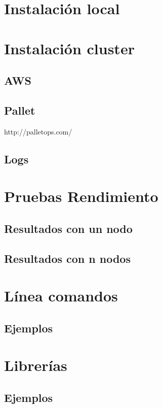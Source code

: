 \section{Instalación local}
\section{Instalación cluster}
\subsection{AWS}
\subsection{Pallet}
http://palletops.com/
\subsection{Logs}
\section{Pruebas Rendimiento}
\subsection{Resultados con un nodo}
\subsection{Resultados con n nodos}
\section{Línea comandos}
\subsection{Ejemplos}
\section{Librerías}
\subsection{Ejemplos}

